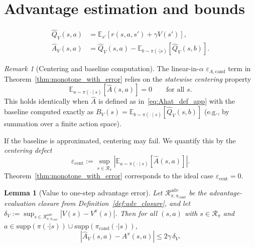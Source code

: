 \documentclass{article}
\theoremstyle{plain}
\newtheorem{lemma}[theorem]{Lemma}
\theoremstyle{definition}
\theoremstyle{remark}
\newtheorem{remark}[theorem]{Remark}
\newcommand{\E}{\mathbb{E}}
\begin{document}
\section{Advantage estimation and bounds}
\label{app:adv_bounds}

\begin{align}
\widehat Q_V(s,a) &= \E_{s'}[r(s,a,s') + \gamma V(s')], \\
\widehat A_V(s,a) &= \widehat Q_V(s,a) -
\E_{b\sim\pi(\cdot|s)}[\widehat Q_V(s,b)].
\label{eq:Ahat_def_app}
\end{align}

\begin{remark}[Centering and baseline computation]
\label{rem:baseline_app}
The linear-in-$\alpha$ $\varepsilon_{A,\mathrm{cand}}$ term in Theorem~\ref{thm:monotone_with_error}
relies on the \emph{statewise centering} property
\[
\E_{a\sim\pi(\cdot\mid s)}[\widehat A(s,a)] = 0 \qquad \text{for all } s.
\]
This holds identically when $\widehat A$ is defined as in~\eqref{eq:Ahat_def_app} with the baseline computed exactly as
$B_V(s)=\E_{b\sim\pi(\cdot\mid s)}[\widehat Q_V(s,b)]$ (e.g., by summation over a finite action space).

If the baseline is approximated, centering may fail. We quantify this by the \emph{centering defect}
\[
\varepsilon_{\mathrm{cent}}
:=
\sup_{s\in\mathcal{R}_\pi}\left|\E_{a\sim\pi(\cdot\mid s)}[\widehat A(s,a)]\right|.
\]
Theorem~\ref{thm:monotone_with_error} corresponds to the ideal case $\varepsilon_{\mathrm{cent}}=0$.
\end{remark}

\begin{lemma}[Value to one-step advantage error]
\label{lem:A_error_app}
Let $\mathcal{R}_{\pi,\pi_{\mathrm{cand}}}^{\mathrm{adv}}$ be the advantage-evaluation closure from Definition~\ref{def:adv_closure},
and let $\delta_V := \sup_{s\in \mathcal{R}_{\pi,\pi_{\mathrm{cand}}}^{\mathrm{adv}}} |V(s)-V^\pi(s)|$.
Then for all $(s,a)$ with $s\in\mathcal{R}_\pi$ and $a\in \mathrm{supp}(\pi(\cdot|s))\cup\mathrm{supp}(\pi_{\mathrm{cand}}(\cdot|s))$,
\[
|\widehat A_V(s,a) - A^\pi(s,a)| \le 2\gamma\,\delta_V.
\]
\end{lemma}
\end{document}
